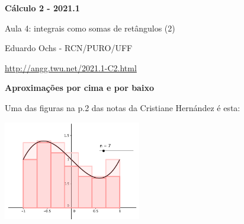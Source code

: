 \documentclass[oneside,12pt]{article}
\begin{document}
\def\Intover     #1#2{\overline {∫}_{#1}#2\,dx}
\def\Intunder    #1#2{\underline{∫}_{#1}#2\,dx}
\def\Intoverunder#1#2{\Intover{#1}{#2} - \Intunder{#1}{#2}}

\def\Intxover     #1#2#3{\overline {∫}_{x=#1}^{x=#2}#3\,dx}
\def\Intxunder    #1#2#3{\underline{∫}_{x=#1}^{x=#2}#3\,dx}

\def\Intoverunder   #1#2{\overline{\underline{∫}}_{#1}      #2\,dx}
\def\Intxoverunder#1#2#3{\overline{\underline{∫}}_{x=#1}^{x=#2} #3\,dx}


%

\thispagestyle{empty}

\begin{center}

\vspace*{1.2cm}

{\bf \Large Cálculo 2 - 2021.1}

\bsk

Aula 4: integrais como somas de retângulos (2)

\bsk

Eduardo Ochs - RCN/PURO/UFF

\url{http://angg.twu.net/2021.1-C2.html}

\end{center}

\newpage


{\bf Aproximações por cima e por baixo}

Uma das figuras na p.2 das notas da Cristiane Hernández é esta:


\includegraphics[width=6cm]{2020-1-C2/area-hernandez-1.png}
\end{document}
